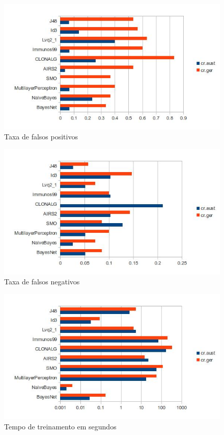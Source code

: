 \begin{figure}[h]
    \centering
    \caption{Taxa de falsos positivos}
    \label{fig:dev_graph_false_pos}
    \includegraphics[width=1\textwidth]{img/graph_false_pos.jpg}
\end{figure}

\begin{figure}[h]
    \centering
    \caption{Taxa de falsos negativos}
    \label{fig:dev_graph_false_neg}
    \includegraphics[width=1\textwidth]{img/graph_false_neg.jpg}
\end{figure}

\begin{figure}[h]
    \centering
    \caption{Tempo de treinamento em segundos}
    \label{fig:dev_graph_train_time}
    \includegraphics[width=1\textwidth]{img/graph_train_time.jpg}
\end{figure}

